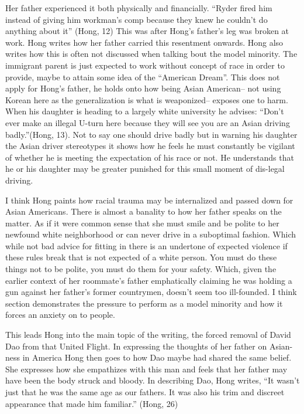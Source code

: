 \documentclass[
]{article}
\begin{document}
Her father experienced it both physically and financially. 
``Ryder fired him instead of giving him workman's comp because they knew he couldn't do anything about it'' (Hong, 12)
This was after Hong's father's leg was broken at work.
Hong writes how her father carried this resentment onwards.  
Hong also writes how this is often not discussed when talking bout the model minority.
The immigrant parent is just expected to work without concept of race in order to provide, maybe to attain some idea of the ``American Dream''.
This does not apply for Hong's father, he holds onto how being Asian American-- not using Korean here as the generalization is what is weaponized-- exposes one to harm. 
When his daughter is heading to a largely white university he advises:
``Don't ever make an illegal U-turn here because they will see you are an Asian driving badly.''(Hong, 13).
Not to say one should drive badly but in warning his daughter the Asian driver stereotypes it shows how he feels he must constantly be vigilant of whether he is meeting the expectation of his race or not.
He understands that he or his daughter may be greater punished for this small moment of dis-legal driving. 
\par
I think Hong paints how racial trauma may be internalized and passed down for Asian Americans.
There is almost a banality to how her father speaks on the matter.
As if it were common sense that she must smile and be polite to her newfound white neighborhood or can never drive in a suboptimal fashion. 
Which while not bad advice for fitting in there is an undertone of expected violence if these rules break that is not expected of a white person.
You must do these things not to be polite, you must do them for your safety.
Which, given the earlier context of her roommate's father emphatically claiming he was holding a gun against her father's former countrymen, doesn't seem too ill-founded.
I think section demonstrates the pressure to perform as a model minority and how it forces an anxiety on to people.
\par
This leads Hong into the main topic of the writing, the forced removal of David Dao from that United Flight.
In expressing the thoughts of her father on Asian-ness in America Hong then goes to how Dao maybe had shared the same belief.
She expresses how she empathizes with this man and feels that her father may have been the body struck and bloody.
In describing Dao, Hong writes, ``It wasn't just that he was the same age as our fathers. It was also his trim and discreet appearance that made him familiar.'' (Hong, 26) 
\end{document}
